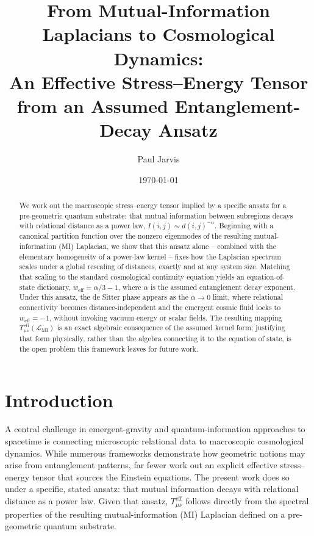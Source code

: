 \documentclass[aps,prd,onecolumn,nofootinbib,preprint]{revtex4-2}
\begin{document}
\title{From Mutual-Information Laplacians to Cosmological Dynamics:\\
An Effective Stress--Energy Tensor from an Assumed Entanglement-Decay Ansatz}

\author{Paul Jarvis}

\date{\today}

\begin{abstract}
We work out the macroscopic stress--energy tensor implied by a specific ansatz for a pre-geometric
quantum substrate: that mutual information between subregions decays with relational distance as a
power law, $I(i,j) \sim d(i,j)^{-\alpha}$. Beginning with a canonical partition function over the
nonzero eigenmodes of the resulting mutual-information (MI) Laplacian, we show that this ansatz
alone -- combined with the elementary homogeneity of a power-law kernel -- fixes how the Laplacian
spectrum scales under a global rescaling of distances, exactly and at any system size. Matching
that scaling to the standard cosmological continuity equation yields an equation-of-state
dictionary, $w_{\mathrm{eff}} = \alpha/3 - 1$, where $\alpha$ is the assumed entanglement decay exponent.
Under this ansatz, the de Sitter phase appears as the $\alpha \to 0$ limit, where relational
connectivity becomes distance-independent and the emergent cosmic fluid locks to
$w_{\mathrm{eff}} = -1$, without invoking vacuum energy or scalar fields. The resulting mapping
$T^{\mathrm{eff}}_{\mu\nu}(\mathcal{L}_{\mathrm{MI}})$ is an exact algebraic consequence of the assumed kernel
form; justifying that form physically, rather than the algebra connecting it to the equation of
state, is the open problem this framework leaves for future work.
\end{abstract}

\maketitle

\section{Introduction}

A central challenge in emergent-gravity and quantum-information approaches to spacetime is
connecting microscopic relational data to macroscopic cosmological dynamics. While numerous
frameworks demonstrate how geometric notions may arise from entanglement patterns, far fewer work
out an explicit effective stress--energy tensor that sources the Einstein equations. The present
work does so under a specific, stated ansatz: that mutual information decays with relational
distance as a power law. Given that ansatz, $T_{\mu\nu}^{\mathrm{eff}}$ follows directly from the spectral
properties of the resulting mutual-information (MI) Laplacian defined on a pre-geometric quantum
substrate.
\end{document}
